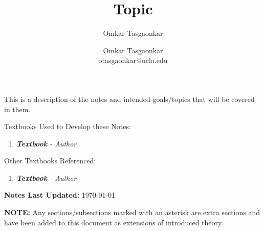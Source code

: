 \documentclass[10pt,letterpaper]{article} %
\author{Omkar Tasgaonkar}
\title{Topic}
\author{Omkar Tasgaonkar \\ \small otasgaonkar@ucla.edu}
\date{}
\begin{document}
\maketitle
This is a description of the notes and intended goals/topics that will be covered in them.

\begin{tcolorbox}[colback=white, colframe=black, arc=0mm]
Textbooks Used to Develop these Notes:
\begin{enumerate}
\item \textit{\textbf{Textbook} - Author}
\end{enumerate}
Other Textbooks Referenced:
\begin{enumerate}
\item \textit{\textbf{Textbook} - Author}
\end{enumerate}
\end{tcolorbox}
\begin{tcolorbox}[colback=white, colframe=black, arc=0mm]
\textbf{Notes Last Updated:} \today
\end{tcolorbox}
\thispagestyle{firstpage}
\newpage
\begin{tcolorbox}[colback=white, colframe=black, arc=0mm]
\tableofcontents
\end{tcolorbox}
\textbf{NOTE:} Any sections/subsections marked with an asterisk are extra sections and have been added to this document as extensions of introduced theory.
\pagebreak
\end{document}
